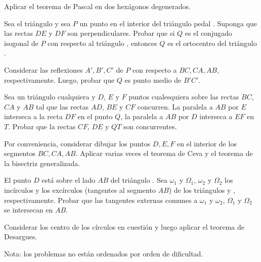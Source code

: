 \begin{hint}
    Aplicar el teorema de Pascal en dos hexágonos degenerados.
\end{hint}


\begin{section-problem}
    Sea el triángulo  y sea $P$ un punto en el interior del triángulo pedal .
    Suponga que las rectas $DE$ y $DF$ son perpendiculares.
    Probar que si $Q$ es el conjugado isogonal de $P$ con respecto al triángulo , entonces $Q$ es el ortocentro del triángulo .
\end{section-problem}

\begin{hint}
    Considerar las reflexiones $A', B', C'$ de $P$ con respecto a $BC, CA, AB$, respectivamente.
    Luego, probar que $Q$ es punto medio de $B'C'$.
\end{hint}


\begin{section-problem}
    Sea  un triángulo cualquiera y $D$, $E$ y $F$ puntos cualesquiera sobre las rectas $BC$, $CA$ y $AB$ tal que las rectas $AD$, $BE$ y $CF$ concurren.
    La paralela a $AB$ por $E$ interseca a la recta $DF$ en el punto $Q$, la paralela a $AB$ por $D$ interseca a $EF$ en $T$.
    Probar que la rectas $CF$, $DE$ y $QT$ son concurrentes.
\end{section-problem}

\begin{hint}
    Por conveniencia, considerar dibujar los puntos $D, E, F$ en el interior de los segmentos $BC, CA, AB$.
    Aplicar varias veces el teorema de Ceva y el teorema de la bisectriz generalizada.
\end{hint}


\begin{section-problem}
    El punto $D$ está sobre el lado $AB$ del triángulo .
    Sea $\omega_1$ y $\Omega_1$, $\omega_2$ y $\Omega_2$ los incírculos y los excírculos (tangentes al segmento $AB$) de los triángulos  y , respectivamente.
    Probar que las tangentes externas comunes a $\omega_1$ y $\omega_2$, $\Omega_1$ y $\Omega_2$ se intersecan en $AB$.
\end{section-problem}

\begin{hint}
    Considerar los centro de los círculos en cuestión y luego aplicar el teorema de Desargues.
\end{hint}


Nota: los problemas no están ordenados por orden de dificultad.